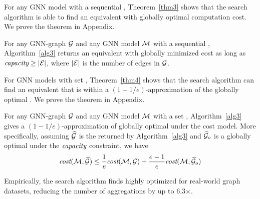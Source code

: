 For any GNN model with a sequential , Theorem~\ref{thm3} shows that the \xg search algorithm is able to find an equivalent \xg with globally optimal computation cost. We prove the theorem in Appendix.

\begin{theorem}
\label{thm3}
For any GNN-graph $\mathcal{G}$ and any GNN model $\mathcal{M}$ with a sequential , Algorithm~\ref{alg3} returns an equivalent \xg with globally minimized cost as long as 
$\mbox{\rm\em capacity}\geq |\mathcal{E}|$, where $|\mathcal{E}|$ is the number of edges in $\mathcal{G}$.
\end{theorem}


For GNN models with set , Theorem~\ref{thm4} shows that the \xg search algorithm can find an equivalent \xg that is within a $(1-1/e)$-approximation of the globally optimal \xgs. We prove the theorem in Appendix.
\begin{theorem}
\label{thm4}
For any GNN-graph $\mathcal{G}$ and any GNN model $\mathcal{M}$ with a set , Algorithm~\ref{alg3} gives a $(1-1/e)$-approximation of globally optimal \xgs under the cost model. More specifically, assuming $\mathcal{\widehat{G}}$ is the \xg returned by Algorithm~\ref{alg3} and $\mathcal{\widehat{G}}_o$ is a globally optimal \xg under the $\mbox{\rm\em capacity}$ constraint, we have
$$
\mbox{\rm\em cost}(\mathcal{M}, \mathcal{\widehat{G}}) \leq \frac{1}{e} \mbox{\rm\em cost}(\mathcal{M}, \mathcal{G}) + \frac{e-1}{e} \mbox{\rm\em cost}(\mathcal{M}, \mathcal{\widehat{G}}_o)
$$
\end{theorem}
Empirically, the \xg search algorithm finds highly optimized \xgs for real-world graph datasets, reducing the number of aggregations by up to 6.3$\times$.

